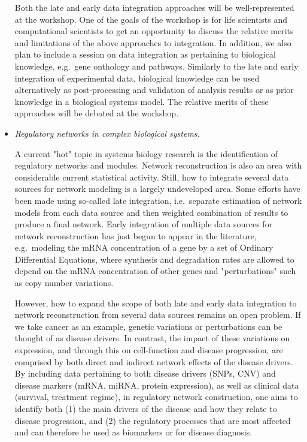 \documentclass[12pt]{amsart}
\begin{document}
\begin{itemize}
  Both the late and early data integration approaches will be
  well-represented at the workshop. One of the goals of the workshop
  is for life scientists and computational scientists to get an
  opportunity to discuss the relative merits and limitations of the
  above approaches to integration. In addition, we also plan to
  include a session on data integration as pertaining to biological
  knowledge, e.g.\ gene onthology and pathways.  Similarly to the late
  and early integration of experimental data, biological knowledge can
  be used alternatively as post-processing and validation of analysis
  results or as prior knowledge in a biological systems model.  The
  relative merits of these approaches will be debated at the workshop.

\item \textit{Regulatory networks in complex biological systems.}

  A current "hot" topic in systems biology research is the
  identification of regulatory networks and modules.  Network
  reconstruction is also an area with considerable current statistical
  activity. Still, how to integrate several data sources for network
  modeling is a largely undeveloped area. Some efforts have been made
  using so-called late integration, i.e.\ separate estimation of
  network models from each data source and then weighted combination
  of results to produce a final network. Early integration of multiple
  data sources for network reconstruction has just begun to appear in
  the literature, e.g.\ modeling the mRNA concentration of a gene by a
  set of Ordinary Differential Equations, where synthesis and
  degradation rates are allowed to depend on the mRNA concentration of
  other genes and "perturbations" such as copy number variations.

  However, how to expand the scope of both late and early data
  integration to network reconstruction from several data sources
  remains an open problem. If we take cancer as an example, genetic
  variations or perturbations can be thought of as disease drivers. In
  contrast, the impact of these variations on expression, and through
  this on cell-function and disease progression, are comprised by both
  direct and indirect network effects of the disease drivers. By
  including data pertaining to both disease drivers (SNPs, CNV) and
  disease markers (mRNA, miRNA, protein expression), as well as
  clinical data (survival, treatment regime), in regulatory network
  construction, one aims to identify both (1) the main drivers of the
  disease and how they relate to disease progression, and (2) the
  regulatory processes that are most affected and can therefore be
  used as biomarkers or for disease diagnosis.


\end{itemize}
\end{document}
